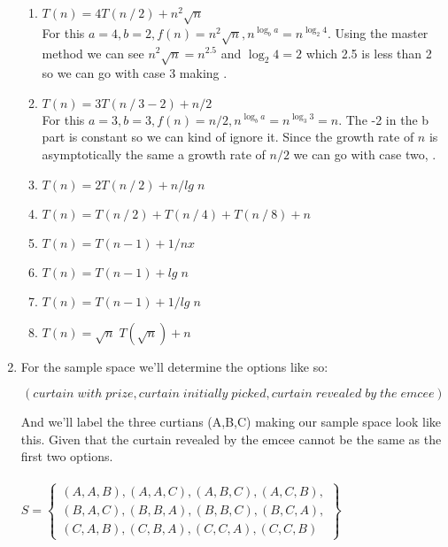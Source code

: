 \documentclass{article}
\begin{document}
\begin{enumerate}
\begin{enumerate}
      \item $T(n) = 4T(n \mathbin{/} 2) + n^2 \sqrt{n}$ \\
      For this $a = 4, b = 2, f(n) = n^2 \sqrt{n}, n^{\log_b a} = n^{\log_2 4}$. 
      Using the master method we can see $n^2 \sqrt{n} = n^{2.5}$ and $\log_2 4 = 2$ 
      which 2.5 is less than 2 so we can go with case 3 making .

      \item $T(n) = 3T(n \mathbin{/} 3 - 2) + n/2$ \\
      For this $a = 3, b = 3, f(n) = n/2, n^{\log_b a} = n^{\log_3 3} = n$. The -2 in the b part is constant so we can kind of ignore it. 
      Since the growth rate of $n$ is asymptotically the same a growth rate of $n/2$ we can go with case two,
      .

      \item $T(n) = 2T(n \mathbin{/} 2) + n/lg\;n$
      \item $T(n) = T(n \mathbin{/} 2) + T(n \mathbin{/} 4) + T(n \mathbin{/} 8) + n$
      \item $T(n) = T(n - 1) + 1/nx$
      \item $T(n) = T(n - 1) + lg\;n$
      \item $T(n) = T(n - 1) + 1/lg\;n$
      \item $T(n) = \sqrt{n}\;T(\sqrt{n}) + n$
    \end{enumerate}

    \item For the sample space we'll determine the options like so:
    
    \[(curtain\;with\;prize, curtain\;initially\;picked, curtain\;revealed\;by\;the\;emcee)\]
    
    And we'll label the three curtians (A,B,C) making our sample space look like this. Given that the curtain revealed by the emcee cannot be the same as the first two options. \\\\
    
    \begin{math} S =
      \left\{
        \begin{array}{l}
          (A,A,B),(A,A,C),(A,B,C),(A,C,B), \\
          (B,A,C),(B,B,A),(B,B,C),(B,C,A), \\
          (C,A,B),(C,B,A),(C,C,A),(C,C,B)
        \end{array}
      \right\}
    \end{math} \\\\
    

\end{enumerate}
\end{document}
